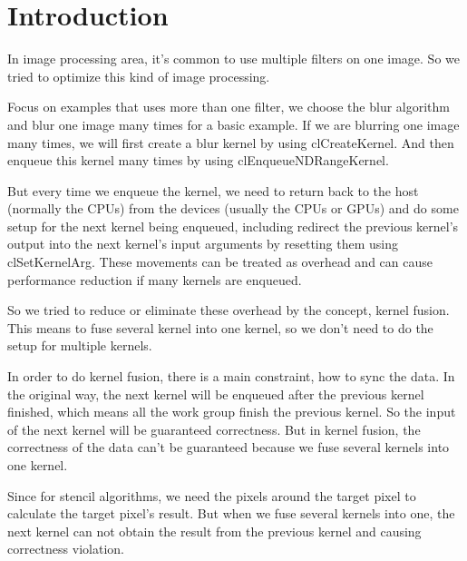\chapter{Introduction}
    In image processing area, it’s common to use multiple filters on one image. So we tried to optimize this kind of image processing.

    Focus on examples that uses more than one filter, we choose the blur algorithm and blur one image many times for a basic example. If we are blurring one image many times, we will first create a blur kernel by using clCreateKernel. And then enqueue this kernel many times by using clEnqueueNDRangeKernel.
    
    But every time we enqueue the kernel, we need to return back to the host (normally the CPUs) from the devices (usually the CPUs or GPUs) and do some setup for the next kernel being enqueued, including redirect the previous kernel’s output into the next  kernel’s input arguments by resetting them using clSetKernelArg. These movements can be treated as overhead and can cause performance reduction if many kernels are enqueued.
    
    So we tried to reduce or eliminate these overhead by the concept, kernel fusion. This means to fuse several kernel into one kernel, so we don’t need to do the setup for multiple kernels.
	
    In order to do kernel fusion, there is a main constraint, how to sync the data. In the original way, the next kernel will be enqueued after the previous kernel finished, which means all the work group finish the previous kernel. So the input of the next kernel will be guaranteed correctness. But in kernel fusion, the correctness of the data can’t be guaranteed because we fuse several kernels into one kernel.
	
    Since for stencil algorithms, we need the pixels around the target pixel to calculate the target pixel’s result. But when we fuse several kernels into one, the next kernel can not obtain the result from the previous kernel and causing correctness violation.
